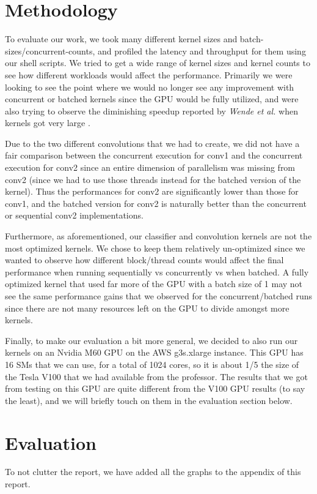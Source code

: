 \documentclass[sigconf]{acmart}
\begin{document}
\section{Methodology}
To evaluate our work, we took many different kernel sizes and batch-sizes/concurrent-counts, and profiled the latency and throughput for them using our shell scripts. We tried to get a wide range of kernel sizes and kernel counts to see how different workloads would affect the performance. Primarily we were looking to see the point where we would no longer see any improvement with concurrent or batched kernels since the GPU would be fully utilized, and were also trying to observe the diminishing speedup reported by \textit{Wende et al.} when kernels got very large \cite{wende_cordes_steinke_2012}. 

Due to the two different convolutions that we had to create, we did not have a fair comparison between the concurrent execution for conv1 and the concurrent execution for conv2 since an entire dimension of parallelism was missing from conv2 (since we had to use those threads instead for the batched version of the kernel). Thus the performances for conv2 are significantly lower than those for conv1, and the batched version for conv2 is naturally better than the concurrent or sequential conv2 implementations.

Furthermore, as aforementioned, our classifier and convolution kernels are not the most optimized kernels. We chose to keep them relatively un-optimized since we wanted to observe how different block/thread counts would affect the final performance when running sequentially vs concurrently vs when batched. A fully optimized kernel that used far more of the GPU with a batch size of 1 may not see the same performance gains that we observed for the concurrent/batched runs since there are not many resources left on the GPU to divide amongst more kernels. 

Finally, to make our evaluation a bit more general, we decided to also run our kernels on an Nvidia M60 GPU on the AWS g3s.xlarge instance. This GPU has 16 SMs that we can use, for a total of 1024 cores, so it is about 1/5 the size of the Tesla V100 that we had available from the professor. The results that we got from testing on this GPU are quite different from the V100 GPU results (to say the least), and we will briefly touch on them in the evaluation section below. 

\section{Evaluation}
To not clutter the report, we have added all the graphs to the appendix of this report.
\end{document}
